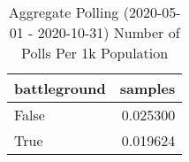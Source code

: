 \begin{table}
\centering
\caption{Aggregate Polling (2020-05-01 - 2020-10-31) Number of Polls Per 1k Population}
\label{table:aggregate\_polling\_2020-05-01\_-\_2020-10-31\_number\_of\_polls\_per\_1k\_population}
\begin{tabular}{lr}
\toprule
 battleground &   samples \\
\midrule
        False &  0.025300 \\
         True &  0.019624 \\
\bottomrule
\end{tabular}
\end{table}
